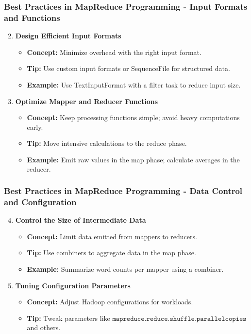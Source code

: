 \documentclass[aspectratio=169]{beamer}
\begin{document}
\begin{frame}[fragile]
    \frametitle{Best Practices in MapReduce Programming - Input Formats and Functions}
    \begin{enumerate}
        \setcounter{enumi}{1}
        \item \textbf{Design Efficient Input Formats}
            \begin{itemize}
                \item \textbf{Concept:} Minimize overhead with the right input format.
                \item \textbf{Tip:} Use custom input formats or SequenceFile for structured data.
                \item \textbf{Example:} Use TextInputFormat with a filter task to reduce input size.
            \end{itemize}

        \item \textbf{Optimize Mapper and Reducer Functions}
            \begin{itemize}
                \item \textbf{Concept:} Keep processing functions simple; avoid heavy computations early.
                \item \textbf{Tip:} Move intensive calculations to the reduce phase.
                \item \textbf{Example:} Emit raw values in the map phase; calculate averages in the reducer.
            \end{itemize}
    \end{enumerate}
\end{frame}

\begin{frame}[fragile]
    \frametitle{Best Practices in MapReduce Programming - Data Control and Configuration}
    \begin{enumerate}
        \setcounter{enumi}{3}
        \item \textbf{Control the Size of Intermediate Data}
            \begin{itemize}
                \item \textbf{Concept:} Limit data emitted from mappers to reducers.
                \item \textbf{Tip:} Use combiners to aggregate data in the map phase.
                \item \textbf{Example:} Summarize word counts per mapper using a combiner.
            \end{itemize}

        \item \textbf{Tuning Configuration Parameters}
            \begin{itemize}
                \item \textbf{Concept:} Adjust Hadoop configurations for workloads.
                \item \textbf{Tip:} Tweak parameters like \( \texttt{mapreduce.reduce.shuffle.parallelcopies} \) and others.
            \end{itemize}
    \end{enumerate}
\end{frame}
\end{document}

